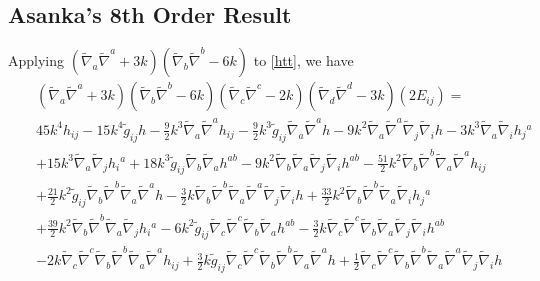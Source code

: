 \documentclass[10pt,letterpaper]{article}
\numberwithin{equation}{section}
\begin{document}
\subsection{Asanka's 8th Order Result}
Applying $(\tilde\nabla_a\tilde\nabla^a+3k)(\tilde\nabla_b\tilde\nabla^b-6k)$ to \eqref{htt}, we have
\begin{eqnarray}
&&(\tilde\nabla_a\tilde\nabla^a+3k)(\tilde\nabla_b\tilde\nabla^b-6k)(\tilde\nabla_c\tilde\nabla^c-2k)(\tilde\nabla_d\tilde\nabla^d-3k)(2E_{ij})=
\nonumber\\
&&45 k^4 h_{ij} - 15 k^4 \tilde{g}_{ij} h -  \tfrac{9}{2} k^3 \tilde{\nabla}_{a}\tilde{\nabla}^{a}h_{ij} -  \tfrac{9}{2} k^3 \tilde{g}_{ij} \tilde{\nabla}_{a}\tilde{\nabla}^{a}h - 9 k^2 \tilde{\nabla}_{a}\tilde{\nabla}^{a}\tilde{\nabla}_{j}\tilde{\nabla}_{i}h - 3 k^3 \tilde{\nabla}_{a}\tilde{\nabla}_{i}h_{j}{}^{a} \nonumber \\ 
&& + 15 k^3 \tilde{\nabla}_{a}\tilde{\nabla}_{j}h_{i}{}^{a} + 18 k^3 \tilde{g}_{ij} \tilde{\nabla}_{b}\tilde{\nabla}_{a}h^{ab} - 9 k^2 \tilde{\nabla}_{b}\tilde{\nabla}_{a}\tilde{\nabla}_{j}\tilde{\nabla}_{i}h^{ab} -  \tfrac{51}{2} k^2 \tilde{\nabla}_{b}\tilde{\nabla}^{b}\tilde{\nabla}_{a}\tilde{\nabla}^{a}h_{ij} \nonumber \\ 
&& + \tfrac{21}{2} k^2 \tilde{g}_{ij} \tilde{\nabla}_{b}\tilde{\nabla}^{b}\tilde{\nabla}_{a}\tilde{\nabla}^{a}h -  \tfrac{3}{2} k \tilde{\nabla}_{b}\tilde{\nabla}^{b}\tilde{\nabla}_{a}\tilde{\nabla}^{a}\tilde{\nabla}_{j}\tilde{\nabla}_{i}h + \tfrac{33}{2} k^2 \tilde{\nabla}_{b}\tilde{\nabla}^{b}\tilde{\nabla}_{a}\tilde{\nabla}_{i}h_{j}{}^{a} \nonumber \\ 
&& + \tfrac{39}{2} k^2 \tilde{\nabla}_{b}\tilde{\nabla}^{b}\tilde{\nabla}_{a}\tilde{\nabla}_{j}h_{i}{}^{a} - 6 k^2 \tilde{g}_{ij} \tilde{\nabla}_{c}\tilde{\nabla}^{c}\tilde{\nabla}_{b}\tilde{\nabla}_{a}h^{ab} -  \tfrac{3}{2} k \tilde{\nabla}_{c}\tilde{\nabla}^{c}\tilde{\nabla}_{b}\tilde{\nabla}_{a}\tilde{\nabla}_{j}\tilde{\nabla}_{i}h^{ab} \nonumber \\ 
&& - 2 k \tilde{\nabla}_{c}\tilde{\nabla}^{c}\tilde{\nabla}_{b}\tilde{\nabla}^{b}\tilde{\nabla}_{a}\tilde{\nabla}^{a}h_{ij} + \tfrac{3}{2} k \tilde{g}_{ij} \tilde{\nabla}_{c}\tilde{\nabla}^{c}\tilde{\nabla}_{b}\tilde{\nabla}^{b}\tilde{\nabla}_{a}\tilde{\nabla}^{a}h + \tfrac{1}{2} \tilde{\nabla}_{c}\tilde{\nabla}^{c}\tilde{\nabla}_{b}\tilde{\nabla}^{b}\tilde{\nabla}_{a}\tilde{\nabla}^{a}\tilde{\nabla}_{j}\tilde{\nabla}_{i}h \nonumber \\ 

\end{eqnarray}
\end{document}
